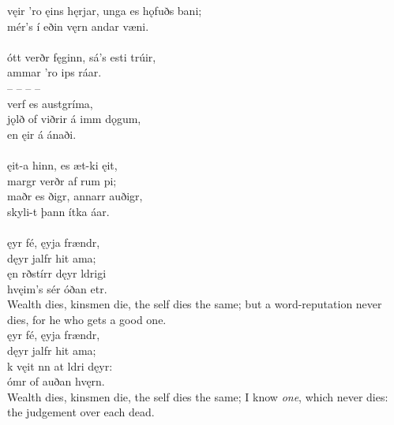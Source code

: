 \bva {}vęir 'ro ęins hęrjar, \hld {}unga es hǫfuðs bani; \\%
\ind mér's í eðin vęrn \hld {}andar væni.\\%

 \\

\bva {}ótt verðr fęginn, \hld sá's esti trúir, \\%
\ind {}ammar 'ro ips ráar. \\%
– – – – \\%
\ind {}verf es austgríma, \\%
jǫlð of viðrir \hld á imm dǫgum, \\%
\ind en ęir á ánaði.\\%

 \\

\bva {}ęit-a hinn, \hld es æt-ki ęit, \\%
\ind margr verðr af rum pi; \\%
maðr es ðigr, \hld annarr auðigr, \\%
\ind skyli-t þann ítka áar.\\%

 \\

\bva {}ęyr fé, \hld {}ęyja frændr, \\%
\ind dęyr jalfr hit ama; \\%
ęn rðstírr \hld dęyr ldrigi \\%
\ind hvęim's sér óðan etr.\\%

\bvb Wealth dies, kinsmen die, the self dies the same; but a word-reputation never dies, for he who gets a good one. \\

\bva {}ęyr fé, \hld {}ęyja frændr, \\%
\ind dęyr jalfr hit ama; \\%
k vęit nn \hld at ldri dęyr: \\%
\ind {}ómr of auðan hvęrn.\\%

\bvb Wealth dies, kinsmen die, the self dies the same; I know \emph{one}, which never dies: the judgement over each dead. \\

